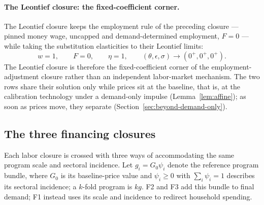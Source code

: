 \paragraph{The Leontief closure: the fixed-coefficient corner.}
The Leontief closure keeps the employment rule of the preceding closure ---
pinned money wage, uncapped and demand-determined employment, $F = 0$ ---
while taking the substitution elasticities to their Leontief limits:
\begin{equation}
w = 1, \qquad F = 0, \qquad \eta = 1,
\qquad (\theta,\epsilon,\sigma) \longrightarrow (0^+,0^+,0^+).
\label{eq:closure-delta}
\end{equation}
The Leontief closure is therefore the fixed-coefficient corner of the
employment-adjustment closure rather than an independent
labor-market mechanism. The two rows share their solution only while prices
sit at the baseline, that is, at the calibration technology under a
demand-only impulse (Lemma~\ref{lem:affine}); as soon as prices move,
they separate (Section~\ref{sec:beyond-demand-only}).

\subsection{The three financing closures}\label{app:financing-closures}

Each labor closure is crossed with three ways of accommodating the same
program scale and sectoral incidence. Let $g_i = G_0\psi_i$ denote the
reference program bundle, where $G_0$ is its baseline-price value and
$\psi_i \geq 0$ with $\sum_i\psi_i = 1$ describes its sectoral incidence;
a $k$-fold program is $kg$. F2 and F3 add this
bundle to final demand; F1 instead uses its scale and incidence to redirect
household spending.

